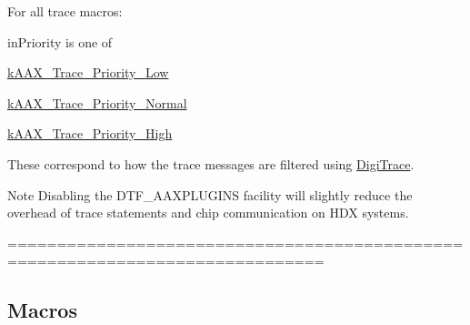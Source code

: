 For all trace macros\+:

{\ttfamily in\+Priority} is one of \begin{DoxyItemize}
\item \mbox{\hyperlink{a00395_abd6b80f2e0a26581086b21b7e7ad0ce9}{k\+A\+A\+X\+\_\+\+Trace\+\_\+\+Priority\+\_\+\+Low}} \item \mbox{\hyperlink{a00395_a8a6953f26f36747357d5d95f96dcf68d}{k\+A\+A\+X\+\_\+\+Trace\+\_\+\+Priority\+\_\+\+Normal}} \item \mbox{\hyperlink{a00395_a5edd9a4ac559a4ef99a948c2ebd422db}{k\+A\+A\+X\+\_\+\+Trace\+\_\+\+Priority\+\_\+\+High}}\end{DoxyItemize}
These correspond to how the trace messages are filtered using \mbox{\hyperlink{a00834}{Digi\+Trace}}.

\begin{DoxyNote}{Note}
Disabling the {\ttfamily D\+T\+F\+\_\+\+A\+A\+X\+P\+L\+U\+G\+I\+NS} facility will slightly reduce the overhead of trace statements and chip communication on H\+DX systems.
\end{DoxyNote}
============================================================================== \subsection*{Macros}
